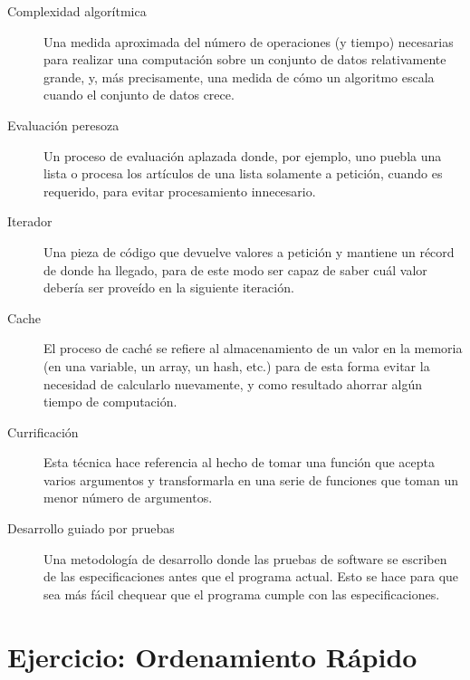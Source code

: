 \begin{description}
\item[Complexidad algorítmica] Una medida aproximada del número de operaciones 
(y tiempo) necesarias para realizar una computación sobre
un conjunto de datos relativamente grande, y, más precisamente, una 
medida de cómo un algoritmo escala cuando el conjunto de datos 
crece.

\item[Evaluación peresoza] Un proceso de evaluación aplazada donde,
por ejemplo, uno puebla una lista o procesa los artículos de una 
lista solamente a petición, cuando es requerido, para evitar 
procesamiento innecesario.

\item[Iterador] Una pieza de código que devuelve valores a petición
y mantiene un récord de donde ha llegado, para de este modo ser
capaz de saber cuál valor debería ser proveído en la siguiente 
iteración.

\item[Cache] El proceso de caché se refiere al almacenamiento de un valor 
en la memoria (en una variable, un array, un hash, etc.) para de esta 
forma evitar la necesidad de calcularlo nuevamente, y como 
resultado ahorrar algún tiempo de computación.

\item[Currificación] Esta técnica hace referencia al hecho de 
tomar una función que acepta varios argumentos y transformarla en 
una serie de funciones que toman un menor número de argumentos.

\item[Desarrollo guiado por pruebas] Una metodología de desarrollo donde las
pruebas de software se escriben de las especificaciones antes que 
el programa actual. Esto se hace para que sea más fácil chequear que 
el programa cumple con las especificaciones.

\end{description}

\section{Ejercicio: Ordenamiento Rápido}
\label{quicksort}

